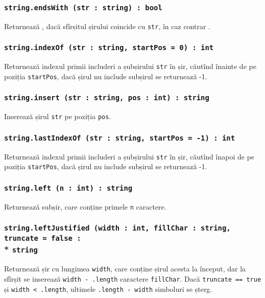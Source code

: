 \subsubsection{\texttt{string.endsWith (str : string) : bool}}

Returnează \true{}, dacă sfîrșitul șirului coincide cu \texttt{str}, în caz contrar \false{}.

\subsubsection{\texttt{string.indexOf (str : string, startPos = 0) : int}}

Returnează indexul primii includeri a șubșirului \texttt{str} în șir, căutînd înainte de pe poziția \texttt{startPos}, dacă șirul nu include subșirul se returnează -1.

\subsubsection{\texttt{string.insert (str : string, pos : int) : string}}

Inserează șirul \texttt{str} pe poziția \texttt{pos}.

\subsubsection{\texttt{string.lastIndexOf (str : string, startPos = -1) : int}}

Returnează indexul primii includeri a șubșirului \texttt{str} în șir, căutînd înapoi de pe poziția \texttt{startPos}, dacă șirul nu include subșirul se returnează -1.

\subsubsection{\texttt{string.left (n : int) : string}}

Returnează subșir, care conține primele \texttt{n} caractere.

\subsubsection{\texttt{string.leftJustified (width : int, fillChar : string, truncate = false :}\\* \texttt{string}}

Returnează șir cu lungimea \texttt{width}, care conține șirul acesta la început, dar la sfîrșit se inserează \texttt{width - .length} caractere \texttt{fillChar}. Dacă \texttt{truncate == true} și \texttt{width < .length}, ultimele \texttt{.length - width} simboluri se șterg.

